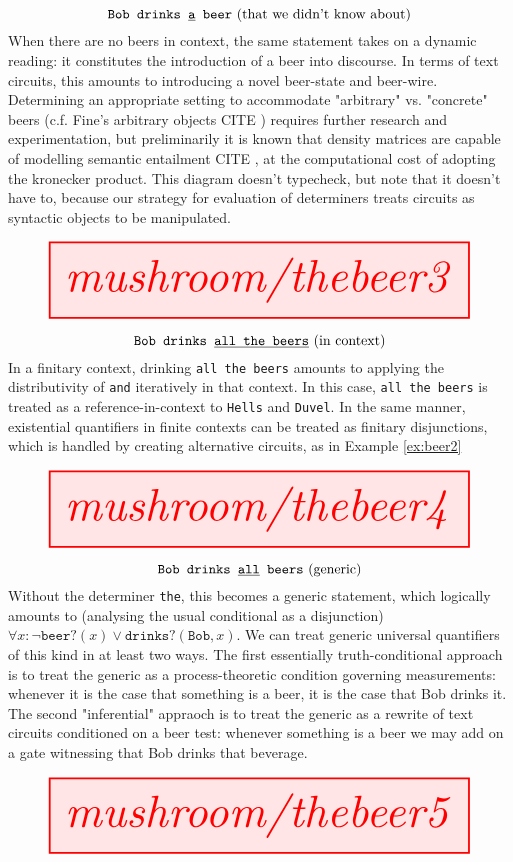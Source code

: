 \begin{myboxR}
\begin{example}\label{ex:det3}
\[\texttt{Bob drinks \underline{a} beer} \text{ (that we didn't know about)}\]
When there are no beers in context, the same statement takes on a dynamic reading: it constitutes the introduction of a beer into discourse. In terms of text circuits, this amounts to introducing a novel beer-state and beer-wire. Determining an appropriate setting to accommodate "arbitrary" vs. "concrete" beers (c.f. Fine's arbitrary objects \bR CITE \e) requires further research and experimentation, but preliminarily it is known that density matrices are capable of modelling semantic entailment \bR CITE \e, at the computational cost of adopting the kronecker product. This diagram doesn't typecheck, but note that it doesn't have to, because our strategy for evaluation of determiners treats circuits as syntactic objects to be manipulated.
\end{example}
\[\resizebox{\textwidth}{!}{\tikzfig{mushroom/thebeer3}}\]
\end{myboxR}

\begin{myboxR}
\begin{example}\label{ex:quant2}
\[\texttt{Bob drinks \underline{all the beers}} \text{ (in context)}\]
In a finitary context, drinking \texttt{all the beers} amounts to applying the distributivity of \texttt{and} iteratively in that context. In this case, \texttt{all the beers} is treated as a reference-in-context to \texttt{Hells} and \texttt{Duvel}. In the same manner, existential quantifiers in finite contexts can be treated as finitary disjunctions, which is handled by creating alternative circuits, as in Example \ref{ex:beer2}
\end{example}
\[\resizebox{\textwidth}{!}{\tikzfig{mushroom/thebeer4}}\]
\end{myboxR}

\begin{myboxR}
\begin{example}\label{ex:quant2}
\[\texttt{Bob drinks \underline{all} beers} \text{ (generic)}\]
Without the determiner \texttt{the}, this becomes a generic statement, which logically amounts to (analysing the usual conditional as a disjunction) $\forall x: \neg\texttt{beer?}(x) \vee \texttt{drinks?}(\texttt{Bob},x)$. We can treat generic universal quantifiers of this kind in at least two ways. The first essentially truth-conditional approach is to treat the generic as a process-theoretic condition governing measurements: whenever it is the case that something is a beer, it is the case that Bob drinks it. The second "inferential" appraoch is to treat the generic as a rewrite of text circuits conditioned on a beer test: whenever something is a beer we may add on a gate witnessing that Bob drinks that beverage.
\end{example}
\[\resizebox{\textwidth}{!}{\tikzfig{mushroom/thebeer5}}\]
\end{myboxR}


